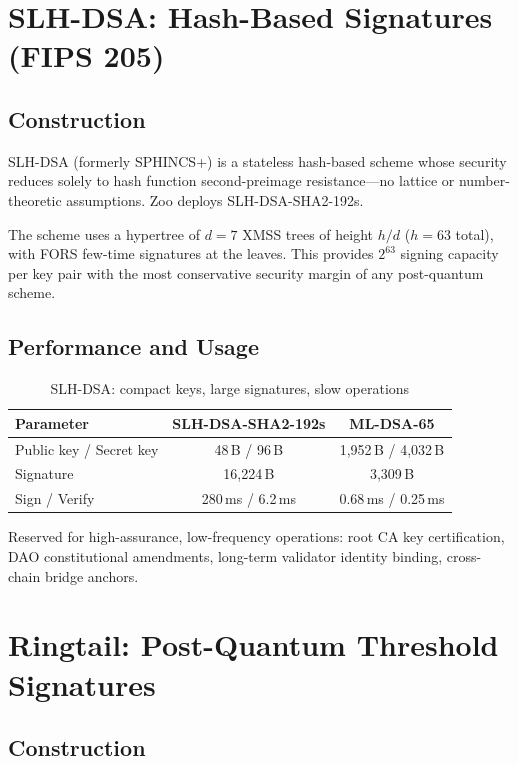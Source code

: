\documentclass[11pt,letterpaper]{article}
\theoremstyle{definition}
\theoremstyle{remark}
\newcommand{\SLHDSA}{\textsc{SLH-DSA}}
\begin{document}
\section{SLH-DSA: Hash-Based Signatures (FIPS 205)}

\subsection{Construction}

\SLHDSA{} (formerly SPHINCS+) is a stateless hash-based scheme whose security reduces solely to hash function second-preimage resistance---no lattice or number-theoretic assumptions. Zoo deploys \SLHDSA{}-SHA2-192s.

The scheme uses a hypertree of $d = 7$ XMSS trees of height $h/d$ ($h = 63$ total), with FORS few-time signatures at the leaves. This provides $2^{63}$ signing capacity per key pair with the most conservative security margin of any post-quantum scheme.

\subsection{Performance and Usage}

\begin{table}[h]
\centering
\begin{tabular}{lcc}
\toprule
\textbf{Parameter} & \textbf{SLH-DSA-SHA2-192s} & \textbf{ML-DSA-65} \\
\midrule
Public key / Secret key & 48\,B / 96\,B & 1,952\,B / 4,032\,B \\
Signature & 16,224\,B & 3,309\,B \\
Sign / Verify & 280\,ms / 6.2\,ms & 0.68\,ms / 0.25\,ms \\
\bottomrule
\end{tabular}
\caption{\SLHDSA{}: compact keys, large signatures, slow operations}
\label{tab:slhdsa-perf}
\end{table}

Reserved for high-assurance, low-frequency operations: root CA key certification, DAO constitutional amendments, long-term validator identity binding, cross-chain bridge anchors.

\section{Ringtail: Post-Quantum Threshold Signatures}

\subsection{Construction}
\end{document}
